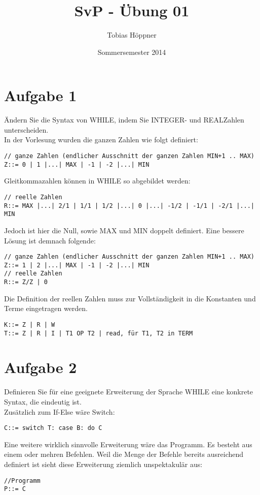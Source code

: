 \documentclass[ngerman,a4paper]{report}
\author{Tobias Höppner}
\title{SvP - Übung 01}
\date{Sommersemester 2014}
\renewcommand{\maketitle}{}
\begin{document}
 
\maketitle 
\section*{Aufgabe 1}
Ändern Sie die Syntax von WHILE, indem Sie INTEGER- und REALZahlen unterscheiden.\\
In der Vorlesung wurden die ganzen Zahlen wie folgt definiert:
\begin{lstlisting}
// ganze Zahlen (endlicher Ausschnitt der ganzen Zahlen MIN+1 .. MAX)
Z::= 0 | 1 |...| MAX | -1 | -2 |...| MIN 
\end{lstlisting}
Gleitkommazahlen können in WHILE so abgebildet werden:
\begin{lstlisting}
// reelle Zahlen
R::= MAX |...| 2/1 | 1/1 | 1/2 |...| 0 |...| -1/2 | -1/1 | -2/1 |...| MIN 
\end{lstlisting}
Jedoch ist hier die Null, sowie MAX und MIN doppelt definiert. Eine bessere Lösung ist demnach folgende:
\begin{lstlisting}
// ganze Zahlen (endlicher Ausschnitt der ganzen Zahlen MIN+1 .. MAX)
Z::= 1 | 2 |...| MAX | -1 | -2 |...| MIN 
// reelle Zahlen
R::= Z/Z | 0 
\end{lstlisting}
Die Definition der reellen Zahlen muss zur Vollständigkeit in die Konstanten und Terme eingetragen werden.
\begin{lstlisting}
K::= Z | R | W
T::= Z | R | I | T1 OP T2 | read, für T1, T2 in TERM
\end{lstlisting}
\section*{Aufgabe 2}
Definieren Sie für eine geeignete Erweiterung der Sprache WHILE eine konkrete Syntax, die eindeutig ist.\\
Zusätzlich zum If-Else wäre Switch:
\begin{lstlisting}
C::= switch T: case B: do C 
\end{lstlisting}
Eine weitere wirklich sinnvolle Erweiterung wäre das Programm. Es besteht aus einem oder mehren Befehlen. Weil die Menge der Befehle bereits ausreichend definiert ist sieht diese Erweiterung ziemlich unspektakulär aus:
\begin{lstlisting}
//Programm
P::= C 
\end{lstlisting}
\end{document}
